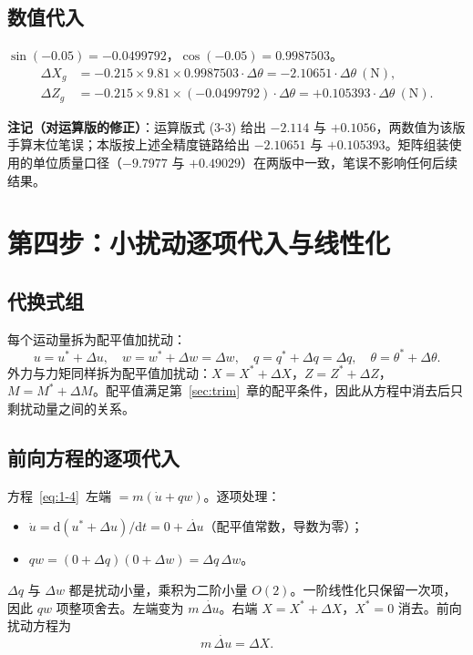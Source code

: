 \documentclass[11pt,a4paper]{ctexart}
\newcommand{\ud}[1]{\dot{#1}}
\newcommand{\dd}{\mathrm{d}}
\begin{document}
\subsection{数值代入}

$\sin(-0.05)=-0.0499792$，$\cos(-0.05)=0.9987503$。
\begin{align}
\Delta X_g &= -0.215\times 9.81\times 0.9987503\cdot\Delta\theta = -2.10651\cdot\Delta\theta\ \mathrm{(N)}, \label{eq:3-3a}\tag{(3-3a)}\\[2pt]
\Delta Z_g &= -0.215\times 9.81\times(-0.0499792)\cdot\Delta\theta = +0.105393\cdot\Delta\theta\ \mathrm{(N)}. \label{eq:3-3b}\tag{(3-3b)}
\end{align}

\begin{notebox}
\textbf{注记（对运算版的修正）}：运算版式 (3-3) 给出 $-2.114$ 与 $+0.1056$，两数值为该版手算末位笔误；本版按上述全精度链路给出 $-2.10651$ 与 $+0.105393$。矩阵组装使用的单位质量口径（$-9.7977$ 与 $+0.49029$）在两版中一致，笔误不影响任何后续结果。
\end{notebox}

\section{第四步：小扰动逐项代入与线性化}\label{sec:peturb}

\subsection{代换式组}

每个运动量拆为配平值加扰动：
\[
u = u^{*}+\Delta u,\quad w = w^{*}+\Delta w = \Delta w,\quad q = q^{*}+\Delta q = \Delta q,\quad \theta = \theta^{*}+\Delta\theta.
\]
外力与力矩同样拆为配平值加扰动：$X=X^{*}+\Delta X$，$Z=Z^{*}+\Delta Z$，$M=M^{*}+\Delta M$。配平值满足第~\ref{sec:trim}~章的配平条件，因此从方程中消去后只剩扰动量之间的关系。

\subsection{前向方程的逐项代入}

方程~\eqref{eq:1-4}~左端 $=m(\ud u+q w)$。逐项处理：
\begin{itemize}[itemsep=1pt]
  \item $\ud u = \dd(u^{*}+\Delta u)/\dd t = 0+\ud{\Delta u}$（配平值常数，导数为零）；
  \item $q w = (0+\Delta q)(0+\Delta w) = \Delta q\,\Delta w$。
\end{itemize}
$\Delta q$ 与 $\Delta w$ 都是扰动小量，乘积为二阶小量 $O(2)$。一阶线性化只保留一次项，因此 $q w$ 项整项舍去。左端变为 $m\,\ud{\Delta u}$。右端 $X=X^{*}+\Delta X$，$X^{*}=0$ 消去。前向扰动方程为
\begin{equation}\label{eq:4-1}
m\,\ud{\Delta u} = \Delta X.
\tag{(4-1)}
\end{equation}
\end{document}
